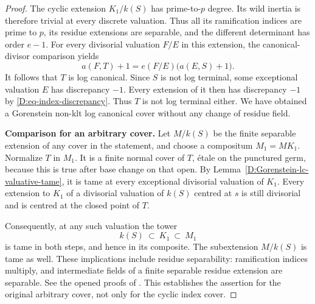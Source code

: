 \begin{proof}
The cyclic extension $K_1/k(S)$ has prime-to-$p$ degree.
Its wild inertia is therefore trivial at every discrete
valuation.  Thus all its ramification indices are prime
to $p$, its residue extensions are separable, and the
different determinant has order $e-1$.  For every
divisorial valuation $F/E$ in this extension, the
canonical-divisor comparison yields
\begin{equation}\label{D:eq-index-discrepancy}
 a(F,T)+1=e(F/E)\bigl(a(E,S)+1\bigr).
\end{equation}
It follows that $T$ is log canonical.  Since $S$ is not
log terminal, some exceptional valuation $E$ has
discrepancy $-1$.  Every extension of it then has
discrepancy $-1$ by \eqref{D:eq-index-discrepancy}.
Thus $T$ is not log terminal either.  We have obtained
a Gorenstein non-klt log canonical cover without any
change of residue field.

\par\smallskip\noindent\textbf{Comparison for an arbitrary cover.}\quad
Let $M/k(S)$ be the finite separable extension of any
cover in the statement, and choose a compositum
$M_1=M K_1$.  Normalize $T$ in $M_1$.
It is a finite normal cover of $T$, \'etale on the
punctured germ, because this is true after base change
on that open.  By
Lemma~\ref{D:Gorenstein-lc-valuative-tame}, it is tame
at every exceptional divisorial valuation of $K_1$.
Every extension to $K_1$ of a divisorial valuation of
$k(S)$ centred at $s$ is still divisorial and is centred
at the closed point of $T$.

Consequently, at any such valuation the tower
\[
 k(S)\ \subset\ K_1\ \subset\ M_1
\]
is tame in both steps, and hence in its composite.
The subextension $M/k(S)$ is tame as well.
These implications include residue separability:
ramification indices multiply, and intermediate
fields of a finite separable residue extension are
separable.  See the opened proofs of
\cite[Lemmas 15.116.5 and 15.116.6]{StacksBIndexTame}.
This establishes the assertion for the original
arbitrary cover, not only for the cyclic index cover.
\end{proof}

